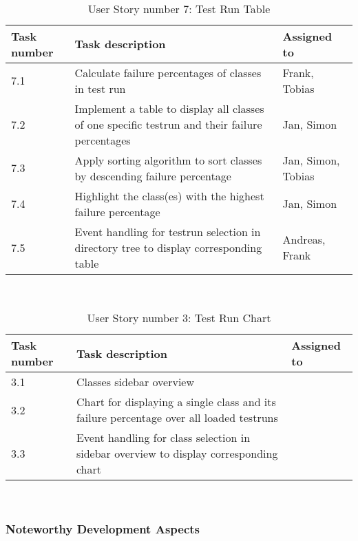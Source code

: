 \ \\ 

\begin{table}[h]
  \caption{User Story number 7: Test Run Table}
  \label{US_Table}
  \centering
  \begin{tabular}{p{1.5cm}|p{9cm}|p{3cm}|}
  	Task number & Task description & Assigned to \\ 
  	\hline
  	\hline
  	7.1 & Calculate failure percentages of classes in test run & Frank, Tobias \\ 
  	\hline
  	7.2 & Implement a table to display all classes of one specific testrun and their failure percentages & Jan, Simon \\ 
  	\hline
  	7.3 & Apply sorting algorithm to sort classes by descending failure percentage & Jan, Simon, Tobias \\
  	\hline
  	7.4 & Highlight the class(es) with the highest failure percentage & Jan, Simon \\
  	\hline
  	7.5 & Event handling for testrun selection in directory tree to display corresponding table & Andreas, Frank \\ 
  	\hline
  \end{tabular}
\end{table} 

\ \\ 

\begin{table}[h]
  \caption{User Story number 3: Test Run Chart}
  \label{US_Chart}
  \centering
  \begin{tabular}{p{1.5cm}|p{9cm}|p{3cm}|}
  	Task number & Task description & Assigned to \\ 
  	\hline
  	\hline
  	3.1 & Classes sidebar overview &  \\ 
  	\hline
  	3.2 & Chart for displaying a single class and its failure percentage over all loaded testruns &  \\ 
  	\hline
  	3.3 & Event handling for class selection in sidebar overview to display corresponding chart &  \\
  	\hline
  \end{tabular}
\end{table} 

\ \\ 

\subsubsection*{Noteworthy Development Aspects}

